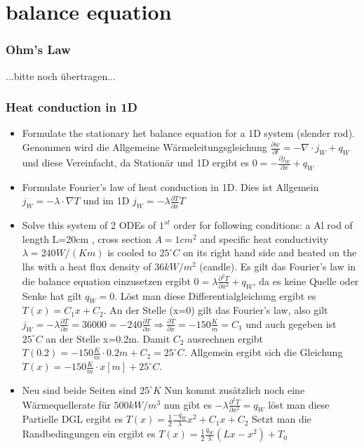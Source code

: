 	\section{balance equation}
	\subsubsection{Ohm's Law}
		...bitte noch übertragen...
		\subsubsection{Heat conduction in 1D}
		\begin{itemize}
			
			\item Formulate the stationary het balance equation for a 1D system (slender rod). Genommen wird die Allgemeine Wärmeleitungsgleichung $\frac{\partial w}{\partial t}= -\nabla \cdot j_W+q_W$ und diese Vereinfacht, da Stationär und 1D ergibt es $0= -\frac{\partial j_W}{\partial x}+q_W$
			
			\item Formulate Fourier's law of heat conduction in 1D. Dies ist Allgemein $j_W=-\lambda \cdot \nabla T$ und im 1D $j_W=-\lambda \frac{\partial T}{\partial x} T$
			
			\item Solve this system of 2 ODEs of $1^{st}$ order for following conditions: a Al rod of length L=20cm , cross section $A=1cm^2$ and specific heat conductivity 
			$ \lambda = 240 W/(Km) $ 
			is cooled to $25^\circ C$ on its right hand side and heated on the lhs with a heat flux density of $ 36 kW/m^2 $ (candle).
			Es gilt das Fourier's law in die balance equation einzusetzen ergibt $ 0=\lambda \frac{\partial^2T}{\partial x^2}+q_W$, da es keine Quelle oder Senke hat gilt $q_W=0$. Löst man diese Differentialgleichung ergibt es $T(x)=C_1x+C_2$. An der Stelle (x=0) gilt das Fourier's law, also gilt $j_W=-\lambda \frac{\partial T}{\partial x} = 36000 = -240 \frac{\partial T}{\partial x } \Rightarrow \frac{\partial T}{\partial x}=-150 \frac{K}{m} =C_1$ und auch gegeben ist $25^\circ C$ an der Stelle x=0.2m. Damit $C_2$ ausrechnen ergibt  $ T(0.2)= -150 \frac{K}{m} \cdot 0.2m+C_2=25^{\circ} C $. Allgemein ergibt sich die Gleichung $ T(x)= -150 \frac{K}{m} \cdot x [m] + 25^{\circ} C $.
			
			\item Neu sind beide Seiten sind $25^\circ K$ Nun kommt zusätzlich noch eine Wärmequellerate für $500 kW/m^3$ nun gibt es $ -\lambda \frac{\partial^2T}{\partial x^2}=q_W$ löst man diese Partielle DGL ergibt es $T(x)=\frac{1}{2}\frac{-q_W}{\lambda} x^2+C_1x+C_2$ Setzt man die Randbedingungen ein ergibt es $T(x)=\frac{1}{2}\frac{q_W}{\lambda}(Lx-x^2)+T_0$
			
			
		\end{itemize}



